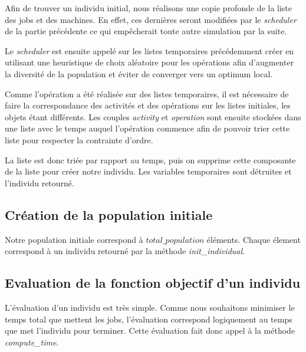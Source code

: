 Afin de trouver un individu initial, nous réalisons une copie profonde de la liste des jobs et des machines. En effet, ces dernières seront modifiées par le \textit{scheduler} de la partie précédente ce qui empêcherait toute autre simulation par la suite. 



Le \textit{scheduler} est ensuite appelé sur les listes temporaires précédemment créer en utilisant une heuristique de choix aléatoire pour les opérations afin d'augmenter la diversité de la population et éviter de converger vers un optimum local.



Comme l'opération a été réalisée sur des listes temporaires, il est nécessaire de faire la correspondance des activités et des opérations sur les listes initiales, les objets étant différents. Les couples \textit{activity} et \textit{operation} sont ensuite stockées dans une liste avec le temps auquel l'opération commence afin de pouvoir trier cette liste pour respecter la contrainte d'ordre.



La liste est donc triée par rapport au temps, puis on supprime cette composante de la liste pour créer notre individu. Les variables temporaires sont détruites et l'individu retourné.

\subsection{Création de la population initiale}



Notre population initiale correspond à $total\_population$ éléments. Chaque élement correspond à un individu retourné par la méthode \textit{init\_individual}.

\subsection{Evaluation de la fonction objectif d'un individu}



L'évaluation d'un individu est très simple. Comme nous souhaitons minimiser le temps total que mettent les jobs, l'évaluation correspond logiquement au temps que met l'individu pour terminer. Cette évaluation fait donc appel à la méthode \textit{compute\_time}. 

